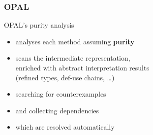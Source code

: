 \documentclass{beamer}
\begin{document}
\begin{frame}
\frametitle{OPAL}
\begin{overlayarea}{\textwidth}{0.8\textheight}
\vspace{1mm}
OPAL's purity analysis
\begin{itemize}
	\item analyses each method assuming \textbf{purity}
	\item scans the intermediate representation,\\ enriched with abstract interpretation results\\ (refined types, def-use chains, \dots)
	\item searching for counterexamples
	\item and collecting dependencies
	\item<3> which are resolved automatically
\end{itemize}
\end{overlayarea}
\end{frame}
\end{document}
